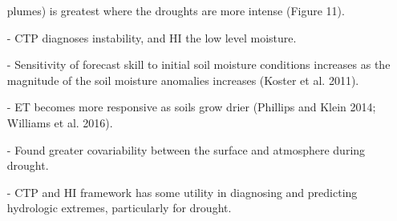 \documentclass[12pt, letterpaper]{article}
\begin{document}
\begin{itemize}
                 plumes) is greatest where the droughts are more intense (Figure 11).
        \item[-] CTP diagnoses instability, and HI the low level moisture.
        \item[-] Sensitivity of forecast skill to initial soil moisture conditions increases as the
                 magnitude of the soil moisture anomalies increases (Koster et al. 2011).
        \item[-] ET becomes more responsive as soils grow drier (Phillips and Klein 2014; 
                 Williams et al. 2016).
        \item[-] Found greater covariability between the surface and atmosphere during drought.
        \item[-] CTP and HI framework has some utility in diagnosing and predicting hydrologic extremes,
                 particularly for drought.
    \end{itemize}
\end{document}
